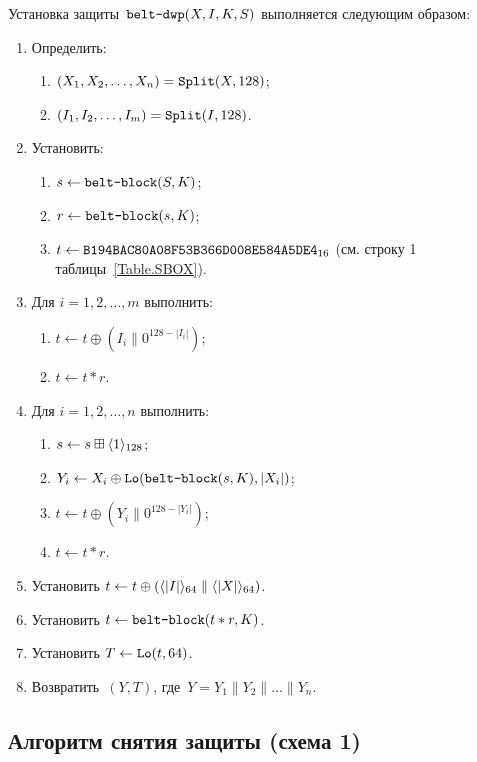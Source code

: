 Установка защиты~$\texttt{belt-dwp}(X,I,K,S)$ выполняется следующим образом:
\begin{enumerate}
\item
Определить: 
\begin{enumerate}
\item
$(X_1,X_2,\ldots,X_n)=\mathop{\texttt{Split}}\nolimits(X, 128)$;
\item
$(I_1,I_2,\ldots,I_m)=\mathop{\texttt{Split}}\nolimits(I, 128)$. 
\end{enumerate}
\item
Установить:
\begin{enumerate}
\item
$s\leftarrow\texttt{belt-block}(S,K)$;
\item
$r\leftarrow \texttt{belt-block}(s,K)$;
\item
$t\leftarrow\texttt{B194BAC80A08F53B366D008E584A5DE4}_{16}$
(см. строку 1 таблицы~\ref{Table.SBOX}).
\end{enumerate}

\item
Для $i=1,2,\ldots,m$ выполнить:
\begin{enumerate}
\item
$t\leftarrow t\oplus (I_i\parallel 0^{128-|I_i|})$;
\item
$t\leftarrow t\ast r$.
\end{enumerate}

\item
Для $i=1,2,\ldots,n$ выполнить:
\begin{enumerate}
\item
$s\leftarrow s\boxplus\langle1\rangle_{128}$;
\item
$Y_i\leftarrow X_i\oplus\mathop{\texttt{Lo}}\nolimits(\texttt{belt-block}(s,K), |X_i|)$;
\item
$t\leftarrow t\oplus (Y_i\parallel 0^{128-|Y_i|})$;
\item
$t\leftarrow t\ast r$.
\end{enumerate}

\item
Установить
$t\leftarrow t\oplus 
(\langle|I|\rangle_{64}\parallel\langle|X|\rangle_{64})$.
\item
Установить
$t\leftarrow \texttt{belt-block}(t\ast r,K)$.
\item
Установить
$T\leftarrow \mathop{\texttt{Lo}}\nolimits(t, 64)$.
\item
Возвратить~$(Y,T)$, 
где~$Y=Y_1\parallel Y_2\parallel\ldots\parallel Y_n$.
\end{enumerate}

\subsection{Алгоритм снятия защиты (схема 1)}\label{AE.DWP.Unwrap}

